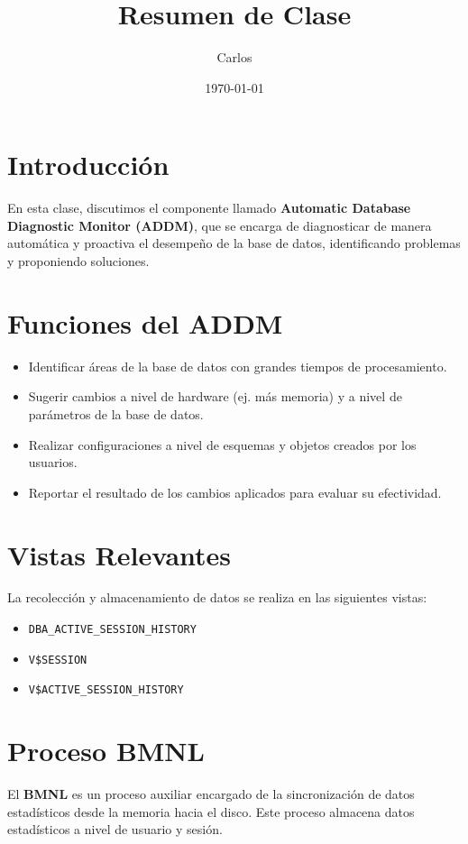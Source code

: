 \documentclass{article}
\title{Resumen de Clase}
\author{Carlos}
\date{\today}
\begin{document}
\maketitle

\section{Introducción}
En esta clase, discutimos el componente llamado \textbf{Automatic Database Diagnostic Monitor (ADDM)}, que se encarga de diagnosticar de manera automática y proactiva el desempeño de la base de datos, identificando problemas y proponiendo soluciones.

\section{Funciones del ADDM}
\begin{itemize}
    \item Identificar áreas de la base de datos con grandes tiempos de procesamiento.
    \item Sugerir cambios a nivel de hardware (ej. más memoria) y a nivel de parámetros de la base de datos.
    \item Realizar configuraciones a nivel de esquemas y objetos creados por los usuarios.
    \item Reportar el resultado de los cambios aplicados para evaluar su efectividad.
\end{itemize}

\section{Vistas Relevantes}
La recolección y almacenamiento de datos se realiza en las siguientes vistas:
\begin{itemize}
    \item \texttt{DBA\_ACTIVE\_SESSION\_HISTORY}
    \item \texttt{V\$SESSION}
    \item \texttt{V\$ACTIVE\_SESSION\_HISTORY}
\end{itemize}

\section{Proceso BMNL}
El \textbf{BMNL} es un proceso auxiliar encargado de la sincronización de datos estadísticos desde la memoria hacia el disco. Este proceso almacena datos estadísticos a nivel de usuario y sesión.
\end{document}

